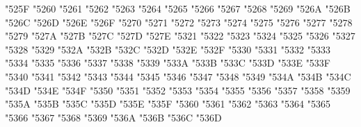 {\Uchar\jis"525F %
\Uchar\jis"5260 %
\Uchar\jis"5261 %
\Uchar\jis"5262 %
\Uchar\jis"5263 %
\Uchar\jis"5264 %
\Uchar\jis"5265 %
\Uchar\jis"5266 %
\Uchar\jis"5267 %
\Uchar\jis"5268 %
\Uchar\jis"5269 %
\Uchar\jis"526A %
\Uchar\jis"526B %
\Uchar\jis"526C %
\Uchar\jis"526D %
\Uchar\jis"526E %
\Uchar\jis"526F %
\Uchar\jis"5270 %
\Uchar\jis"5271 %
\Uchar\jis"5272 %
\Uchar\jis"5273 %
\Uchar\jis"5274 %
\Uchar\jis"5275 %
\Uchar\jis"5276 %
\Uchar\jis"5277 %
\Uchar\jis"5278 %
\Uchar\jis"5279 %
\Uchar\jis"527A %
\Uchar\jis"527B %
\Uchar\jis"527C %
\Uchar\jis"527D %
\Uchar\jis"527E %
\Uchar\jis"5321 %
\Uchar\jis"5322 %
\Uchar\jis"5323 %
\Uchar\jis"5324 %
\Uchar\jis"5325 %
\Uchar\jis"5326 %
\Uchar\jis"5327 %
\Uchar\jis"5328 %
\Uchar\jis"5329 %
\Uchar\jis"532A %
\Uchar\jis"532B %
\Uchar\jis"532C %
\Uchar\jis"532D %
\Uchar\jis"532E %
\Uchar\jis"532F %
\Uchar\jis"5330 %
\Uchar\jis"5331 %
\Uchar\jis"5332 %
\Uchar\jis"5333 %
\Uchar\jis"5334 %
\Uchar\jis"5335 %
\Uchar\jis"5336 %
\Uchar\jis"5337 %
\Uchar\jis"5338 %
\Uchar\jis"5339 %
\Uchar\jis"533A %
\Uchar\jis"533B %
\Uchar\jis"533C %
\Uchar\jis"533D %
\Uchar\jis"533E %
\Uchar\jis"533F %
\Uchar\jis"5340 %
\Uchar\jis"5341 %
\Uchar\jis"5342 %
\Uchar\jis"5343 %
\Uchar\jis"5344 %
\Uchar\jis"5345 %
\Uchar\jis"5346 %
\Uchar\jis"5347 %
\Uchar\jis"5348 %
\Uchar\jis"5349 %
\Uchar\jis"534A %
\Uchar\jis"534B %
\Uchar\jis"534C %
\Uchar\jis"534D %
\Uchar\jis"534E %
\Uchar\jis"534F %
\Uchar\jis"5350 %
\Uchar\jis"5351 %
\Uchar\jis"5352 %
\Uchar\jis"5353 %
\Uchar\jis"5354 %
\Uchar\jis"5355 %
\Uchar\jis"5356 %
\Uchar\jis"5357 %
\Uchar\jis"5358 %
\Uchar\jis"5359 %
\Uchar\jis"535A %
\Uchar\jis"535B %
\Uchar\jis"535C %
\Uchar\jis"535D %
\Uchar\jis"535E %
\Uchar\jis"535F %
\Uchar\jis"5360 %
\Uchar\jis"5361 %
\Uchar\jis"5362 %
\Uchar\jis"5363 %
\Uchar\jis"5364 %
\Uchar\jis"5365 %
\Uchar\jis"5366 %
\Uchar\jis"5367 %
\Uchar\jis"5368 %
\Uchar\jis"5369 %
\Uchar\jis"536A %
\Uchar\jis"536B %
\Uchar\jis"536C %
\Uchar\jis"536D %
}
